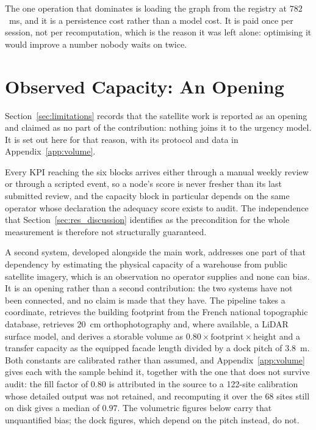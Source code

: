 The one operation that dominates is loading the graph from the registry at $782$~ms, and it
is a persistence cost rather than a model cost. It is paid once per session, not per
recomputation, which is the reason it was left alone: optimising it would improve a number
nobody waits on twice.



\section{Observed Capacity: An Opening}
\label{app:opening}

Section~\ref{sec:limitations} records that the satellite work is reported as an
opening and claimed as no part of the contribution: nothing joins it to the
urgency model. It is set out here for that reason, with its protocol and data in
Appendix~\ref{app:volume}.

\label{sec:res_volume}

Every KPI reaching the six blocks arrives either through a manual weekly review or through a
scripted event, so a node's score is never fresher than its last submitted review, and the
capacity block in particular depends on the same operator whose declaration the adequacy
score exists to audit. The independence that Section~\ref{sec:res_discussion} identifies as
the precondition for the whole measurement is therefore not structurally guaranteed.

A second system, developed alongside the main work, addresses one part of that dependency by
estimating the physical capacity of a warehouse from public satellite imagery, which is an
observation no operator supplies and none can bias. It is an opening rather than a second
contribution: the two systems have not been connected, and no claim is made that they have.
The pipeline takes a coordinate, retrieves the building footprint from the French national
topographic database, retrieves 20~cm orthophotography and, where available, a LiDAR surface
model, and derives a storable volume as $0.80 \times \text{footprint} \times \text{height}$
and a transfer capacity as the equipped facade length divided by a dock pitch of $3.8$~m.
Both constants are calibrated rather than assumed, and Appendix~\ref{app:volume} gives each
with the sample behind it, together with the one that does not survive audit: the fill factor
of $0.80$ is attributed in the source to a 122-site calibration whose detailed output was not
retained, and recomputing it over the 68 sites still on disk gives a median of $0.97$. The
volumetric figures below carry that unquantified bias; the dock figures, which depend on the
pitch instead, do not.

